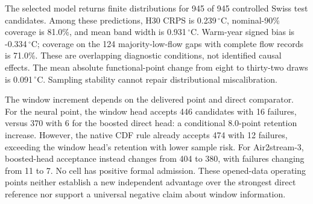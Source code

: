 The selected model returns finite distributions for 945 of 945 controlled Swiss test candidates. Among these predictions, H30 CRPS is 0.239\,$^{\circ}$C, nominal-90\% coverage is 81.0\%, and mean band width is 0.931\,$^{\circ}$C. Warm-year signed bias is -0.334\,$^{\circ}$C; coverage on the 124 majority-low-flow gaps with complete flow records is 71.0\%. These are overlapping diagnostic conditions, not identified causal effects. The mean absolute functional-point change from eight to thirty-two draws is 0.091\,$^{\circ}$C. Sampling stability cannot repair distributional miscalibration.

The window increment depends on the delivered point and direct comparator. For the neural point, the window head accepts 446 candidates with 16 failures, versus 370 with 6 for the boosted direct head: a conditional 8.0-point retention increase. However, the native CDF rule already accepts 474 with 12 failures, exceeding the window head's retention with lower sample risk. For Air2stream-3, boosted-head acceptance instead changes from 404 to 380, with failures changing from 11 to 7. No cell has positive formal admission. These opened-data operating points neither establish a new independent advantage over the strongest direct reference nor support a universal negative claim about window information.
